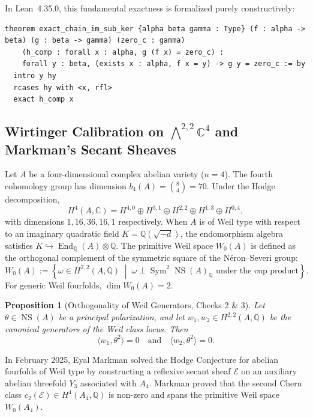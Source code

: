 \documentclass[11pt,a4paper]{article}
\newtheorem{proposition}[theorem]{Proposition}
\theoremstyle{definition}
\theoremstyle{remark}
\DeclareMathOperator{\Sym}{Sym}
\DeclareMathOperator{\End}{End}
\begin{document}
In Lean~4.35.0, this fundamental exactness is formalized purely constructively:
\begin{lstlisting}[basicstyle=\ttfamily\scriptsize,frame=single,breaklines=true]
theorem exact_chain_im_sub_ker {alpha beta gamma : Type} (f : alpha -> beta) (g : beta -> gamma) (zero_c : gamma)
    (h_comp : forall x : alpha, g (f x) = zero_c) :
    forall y : beta, (exists x : alpha, f x = y) -> g y = zero_c := by
  intro y hy
  rcases hy with <x, rfl>
  exact h_comp x
\end{lstlisting}

\subsection{Wirtinger Calibration on $\bigwedge^{2,2}\mathbb{C}^4$ and Markman's Secant Sheaves}
Let $A$ be a four-dimensional complex abelian variety ($n = 4$). The fourth cohomology group has dimension $b_4(A) = \binom{8}{4} = 70$. Under the Hodge decomposition,
\begin{equation}
H^4(A, \mathbb{C}) = H^{4,0} \oplus H^{3,1} \oplus H^{2,2} \oplus H^{1,3} \oplus H^{0,4},
\end{equation}
with dimensions $1, 16, 36, 16, 1$ respectively. When $A$ is of Weil type with respect to an imaginary quadratic field $K = \mathbb{Q}(\sqrt{-d})$, the endomorphism algebra satisfies $K \hookrightarrow \End_{\mathbb{Q}}(A) \otimes \mathbb{Q}$. The primitive Weil space $W_0(A)$ is defined as the orthogonal complement of the symmetric square of the Néron--Severi group:
\begin{equation}
W_0(A) := \left\{ \omega \in H^{2,2}(A, \mathbb{Q}) \;\middle|\; \omega \perp \Sym^2 \operatorname{NS}(A)_{\mathbb{Q}} \text{ under the cup product} \right\}.
\end{equation}
For generic Weil fourfolds, $\dim W_0(A) = 2$.

\begin{proposition}[Orthogonality of Weil Generators, Checks 2 \& 3]
Let $\theta \in \operatorname{NS}(A)$ be a principal polarization, and let $w_1, w_2 \in H^{2,2}(A, \mathbb{Q})$ be the canonical generators of the Weil class locus. Then
\begin{equation}
\langle w_1, \theta^2 \rangle = 0 \quad \text{and} \quad \langle w_2, \theta^2 \rangle = 0.
\end{equation}
\end{proposition}

In February 2025, Eyal Markman \cite{Markman2025} solved the Hodge Conjecture for abelian fourfolds of Weil type by constructing a reflexive secant sheaf $\mathcal{E}$ on an auxiliary abelian threefold $Y_3$ associated with $A_4$. Markman proved that the second Chern class $c_2(\mathcal{E}) \in H^4(A_4, \mathbb{Q})$ is non-zero and spans the primitive Weil space $W_0(A_4)$.
\end{document}

